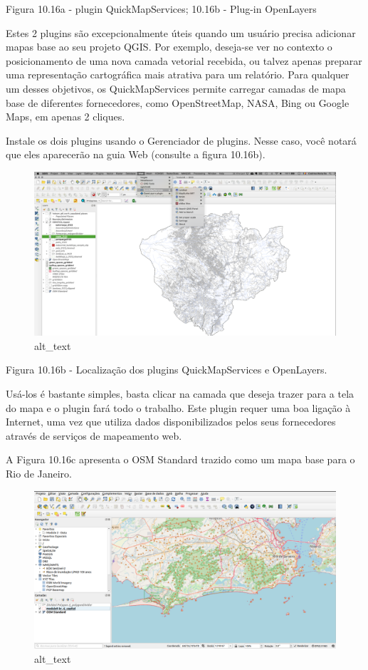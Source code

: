 \documentclass[
]{book}
\begin{document}
Figura 10.16a - plugin QuickMapServices; 10.16b - Plug-in OpenLayers

Estes 2 plugins são excepcionalmente úteis quando um usuário precisa adicionar mapas base ao seu projeto QGIS. Por exemplo, deseja-se ver no contexto o posicionamento de uma nova camada vetorial recebida, ou talvez apenas preparar uma representação cartográfica mais atrativa para um relatório. Para qualquer um desses objetivos, os QuickMapServices permite carregar camadas de mapa base de diferentes fornecedores, como OpenStreetMap, NASA, Bing ou Google Maps, em apenas 2 cliques.

Instale os dois plugins usando o Gerenciador de plugins. Nesse caso, você notará que eles aparecerão na guia Web (consulte a figura 10.16b).

\begin{figure}
\centering
\includegraphics{media/modulo10/fig1016_b.png}
\caption{alt\_text}
\end{figure}

Figura 10.16b - Localização dos plugins QuickMapServices e OpenLayers.

Usá-los é bastante simples, basta clicar na camada que deseja trazer para a tela do mapa e o plugin fará todo o trabalho. Este plugin requer uma boa ligação à Internet, uma vez que utiliza dados disponibilizados pelos seus fornecedores através de serviços de mapeamento web.

A Figura 10.16c apresenta o OSM Standard trazido como um mapa base para o Rio de Janeiro.

\begin{figure}
\centering
\includegraphics{media/modulo10/fig1016_c.png}
\caption{alt\_text}
\end{figure}
\end{document}
